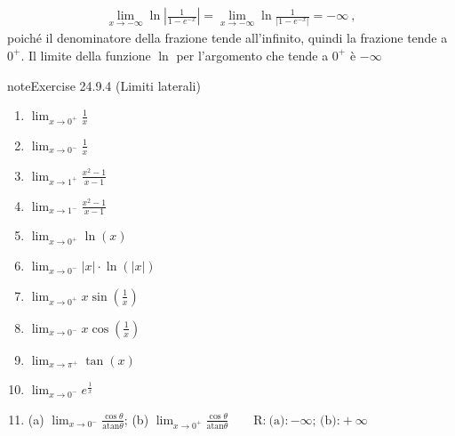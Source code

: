\documentclass[letterpaper,10pt,italian]{jupyterBook}
\begin{document}
\sphinxAtStartPar
{}
\begin{equation*}
\begin{split}\lim_{x \to -\infty} \ln \left| \frac{1}{1 - e^{-x}} \right| =\lim_{x \to -\infty} \ln \frac{1}{\left| 1 - e^{-x} \right|} = - \infty \ ,\end{split}
\end{equation*}
\sphinxAtStartPar
poiché il denominatore della frazione tende all’infinito, quindi la frazione tende a \(0^+\). Il limite della funzione \(\ln\) per l’argomento che tende a \(0^+\) è \(-\infty\)
 \label{exercise:ex-limits-lateral}

\begin{sphinxadmonition}{note}{Exercise 24.9.4 (Limiti laterali)}




\begin{enumerate}
%
\item {} 
\sphinxAtStartPar
\(\lim_{x \to 0^+} \frac{1}{x}\)

\item {} 
\sphinxAtStartPar
\(\lim_{x \to 0^-} \frac{1}{x}\)

\item {} 
\sphinxAtStartPar
\(\lim_{x \to 1^+} \frac{x^2 - 1}{x - 1}\)

\item {} 
\sphinxAtStartPar
\(\lim_{x \to 1^-} \frac{x^2 - 1}{x - 1}\)

\item {} 
\sphinxAtStartPar
\(\lim_{x \to 0^+} \ln(x)\)

\item {} 
\sphinxAtStartPar
\(\lim_{x \to 0^-} |x| \cdot \ln(|x|)\)

\item {} 
\sphinxAtStartPar
\(\lim_{x \to 0^+} x \sin\left(\frac{1}{x}\right)\)

\item {} 
\sphinxAtStartPar
\(\lim_{x \to 0^-} x \cos\left(\frac{1}{x}\right)\)

\item {} 
\sphinxAtStartPar
\(\lim_{x \to \pi^+} \tan(x)\)

\item {} 
\sphinxAtStartPar
\(\lim_{x \to 0^-} e^{\frac{1}{x}}\)

\item {} 
\sphinxAtStartPar
(a) \(\lim_{x \to 0^-} \frac{\cos \theta}{\text{atan} \theta}\); (b) \(\lim_{x \to 0^+} \frac{\cos \theta}{\text{atan} \theta} \qquad \text{R:}\ \text{(a)}: -\infty\text{; (b):} +\infty\)

\end{enumerate}
\end{sphinxadmonition}
\end{document}
